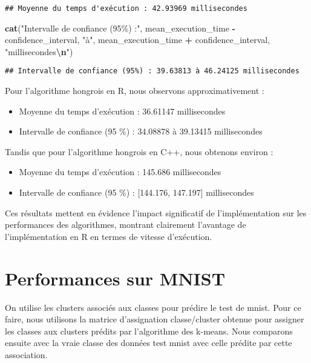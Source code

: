 \documentclass[
]{article}
\newenvironment{Shaded}{\begin{snugshade}}{\end{snugshade}}
\newcommand{\FunctionTok}[1]{\textcolor[rgb]{0.13,0.29,0.53}{\textbf{#1}}}
\newcommand{\NormalTok}[1]{#1}
\newcommand{\SpecialCharTok}[1]{\textcolor[rgb]{0.81,0.36,0.00}{\textbf{#1}}}
\newcommand{\StringTok}[1]{\textcolor[rgb]{0.31,0.60,0.02}{#1}}
\providecommand{\tightlist}{%
  \setlength{\itemsep}{0pt}\setlength{\parskip}{0pt}}
\begin{document}
\begin{verbatim}
## Moyenne du temps d'exécution : 42.93969 millisecondes
\end{verbatim}

\begin{Shaded}
\begin{Highlighting}[]
\FunctionTok{cat}\NormalTok{(}\StringTok{"Intervalle de confiance (95\%) :"}\NormalTok{, mean\_execution\_time }\SpecialCharTok{{-}}\NormalTok{ confidence\_interval,}
    \StringTok{"à"}\NormalTok{, mean\_execution\_time }\SpecialCharTok{+}\NormalTok{ confidence\_interval, }\StringTok{"millisecondes}\SpecialCharTok{\textbackslash{}n}\StringTok{"}\NormalTok{)}
\end{Highlighting}
\end{Shaded}

\begin{verbatim}
## Intervalle de confiance (95%) : 39.63813 à 46.24125 millisecondes
\end{verbatim}

Pour l'algorithme hongrois en R, nous observons approximativement :

\begin{itemize}
\tightlist
\item
  Moyenne du temps d'exécution : 36.61147 millisecondes
\item
  Intervalle de confiance (95 \%) : 34.08878 à 39.13415 millisecondes
\end{itemize}

Tandis que pour l'algorithme hongrois en C++, nous obtenons environ :

\begin{itemize}
\tightlist
\item
  Moyenne du temps d'exécution : 145.686 millisecondes
\item
  Intervalle de confiance (95 \%) : {[}144.176, 147.197{]} millisecondes
\end{itemize}

Ces résultats mettent en évidence l'impact significatif de
l'implémentation sur les performances des algorithmes, montrant
clairement l'avantage de l'implémentation en R en termes de vitesse
d'exécution.

\hypertarget{performances-sur-mnist}{%
\section{Performances sur MNIST}\label{performances-sur-mnist}}

On utilise les clusters associés aux classes pour prédire le test de
mnist. Pour ce faire, nous utilisons la matrice d'assignation
classe/cluster obtenue pour assigner les classes aux clusters prédits
par l'algorithme des k-means. Nous comparons ensuite avec la vraie
classe des données test mnist avec celle prédite par cette association.
\end{document}
